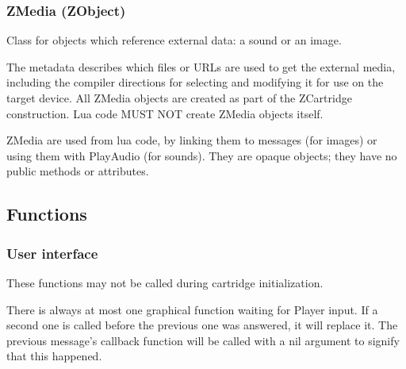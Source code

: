 \documentclass{article}
\begin{document}
\subsubsection{ZMedia (ZObject)}
Class for objects which reference external data: a sound or an image.

The metadata describes which files or URLs are used to get the external media,
including the compiler directions for selecting and modifying it for use on the
target device. All ZMedia objects are created as part of the ZCartridge
construction. Lua code MUST NOT create ZMedia objects itself.

ZMedia are used from lua code, by linking them to messages (for images) or
using them with PlayAudio (for sounds). They are opaque objects; they have no
public methods or attributes.

\subsection{Functions}
\subsubsection{User interface}
These functions may not be called during cartridge initialization.

There is always at most one graphical function waiting for Player input. If a
second one is called before the previous one was answered, it will replace it.
The previous message's callback function will be called with a nil argument to
signify that this happened.
\end{document}
